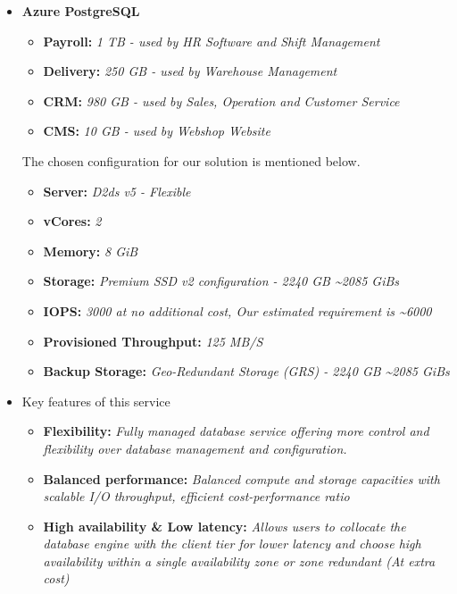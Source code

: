 \documentclass{llncs}
\begin{document}
\begin{itemize}
    \item \textbf{Azure PostgreSQL}
          \begin{itemize}
              \item \textbf{Payroll:} \textit{1 TB - used by HR Software and Shift Management}
              \item  \textbf{Delivery:} \textit{250 GB - used by Warehouse Management}
              \item  \textbf{CRM:} \textit{980 GB - used by Sales, Operation and Customer Service}
              \item  \textbf{CMS:} \textit{10 GB - used by Webshop Website}
          \end{itemize} \leavevmode\newline
          The chosen configuration for our solution is mentioned below.
          \begin{itemize}
              \item \textbf{Server:} \textit{D2ds v5 - Flexible}
              \item  \textbf{vCores:} \textit{2}
              \item  \textbf{Memory:} \textit{8 GiB}
              \item  \textbf{Storage:} \textit{Premium SSD v2 configuration - 2240 GB \textasciitilde 2085 GiBs}
              \item  \textbf{IOPS:} \textit{3000 at no additional cost, Our estimated requirement is \textasciitilde 6000}
              \item  \textbf{Provisioned Throughput:} \textit{125 MB/S}
              \item  \textbf{Backup Storage:} \textit{Geo-Redundant Storage (GRS) - 2240 GB \textasciitilde 2085 GiBs}
          \end{itemize}
    \item Key features of this service
          \begin{itemize}
              \item  \textbf{Flexibility:} \textit{Fully managed database service offering more control and flexibility over database management and configuration.}
              \item  \textbf{Balanced performance:} \textit{Balanced compute and storage capacities with scalable I/O throughput, efficient cost-performance ratio}
              \item  \textbf{High availability \& Low latency:} \textit{Allows users to collocate the database engine with the client tier for lower latency and choose high availability within a single availability zone or zone redundant (At extra cost)}

\end{itemize}
\end{itemize}
\end{document}
